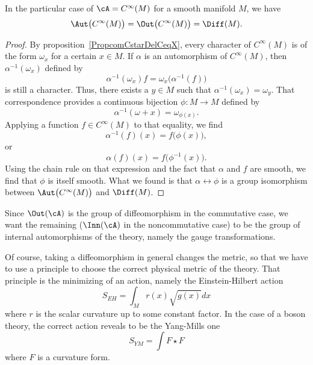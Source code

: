 \begin{proposition}
	In the particular case of $\cA= C^{\infty}(M)$ for a smooth manifold $M$, we have
	\[
		\Aut\big(  C^{\infty}(M) \big)=\Out\big(  C^{\infty}(M) \big)=\Diff(M).
	\]
\end{proposition}

\begin{proof}

	By proposition~\ref{PropcomCstarDelCeqX}, every character of $ C^{\infty}(M)$ is of the form $\omega_x$ for a certain $x\in M$. If $\alpha$ is an automorphism of $ C^{\infty}(M)$, then $\alpha^{-1}(\omega_x)$ defined by
	\[
		\alpha^{-1}(\omega_x)f=\omega_x\big( \alpha^{-1}(f) \big)
	\]
	is still a character. Thus, there exists a $y\in M$ such that $\alpha^{-1}(\omega_x)=\omega_y$. That correspondence provides a continuous bijection $\phi\colon M\to M$ defined by
	\[
		\alpha^{-1}(\omega+x)=\omega_{\phi(x)}.
	\]
	Applying a function $f\in C^{\infty}(M)$ to that equality, we find
	\[
		\alpha^{-1}(f)(x)=f\big( \phi(x) \big),
	\]
	or
	\begin{equation}
		\alpha(f)(x)=f\big( \phi^{-1}(x) \big).
	\end{equation}
	Using the chain rule on that expression and the fact that $\alpha$ and $f$ are smooth, we find that $\phi$ is itself smooth. What we found is that $\alpha\leftrightarrow \phi$ is a group isomorphism between $\Aut\big(  C^{\infty}(M) \big)$ and $\Diff(M)$.
\end{proof}

Since $\Out(\cA)$ is the group of diffeomorphism in the commutative case, we want the remaining ($\Inn(\cA)$ in the noncommutative case) to be the group of internal automorphisms of the theory, namely the gauge transformations.

Of course, taking a diffeomorphism in general changes the metric, so that we have to use a principle to choose the correct physical metric of the theory. That principle is the minimizing of an action, namely the Einstein-Hilbert action
\[
	S_{EH}=\int_Mr(x)\sqrt{g(x)}dx
\]
where $r$ is the scalar curvature up to some constant factor. In the case of a boson theory, the correct action reveals to be the Yang-Mills one
\[
	S_{YM}=\int F\star F
\]
where $F$ is a curvature form.


